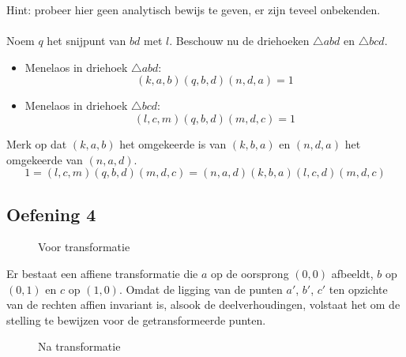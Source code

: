 \documentclass[main.tex]{subfiles}
\begin{document}
Hint: probeer hier geen analytisch bewijs te geven, er zijn teveel onbekenden.\\\\
Noem $q$ het snijpunt van $bd$ met $l$.
Beschouw nu de driehoeken $\triangle abd$ en $\triangle bcd$.
\begin{itemize}
\item Menelaos in driehoek $\triangle abd$:
  \[ (k,a,b)(q,b,d)(n,d,a) = 1 \]
\item Menelaos in driehoek $\triangle bcd$:
  \[ (l,c,m)(q,b,d)(m,d,c) = 1 \]
\end{itemize}
Merk op dat $(k,a,b)$ het omgekeerde is van $(k,b,a)$ en $(n,d,a)$ het omgekeerde van $(n,a,d)$.
\[ 1 = (l,c,m)(q,b,d)(m,d,c) = (n,a,d)(k,b,a)(l,c,d)(m,d,c) \]

\subsection{Oefening 4}
\begin{figure}[H]
  \centering
  \caption{Voor transformatie}
\end{figure}
Er bestaat een affiene transformatie die $a$ op de oorsprong $(0,0)$ afbeeldt, $b$ op $(0,1)$ en $c$ op $(1,0)$.
Omdat de ligging van de punten $a'$, $b'$, $c'$ ten opzichte van de rechten affien invariant is, alsook de deelverhoudingen, volstaat het om de stelling te bewijzen voor de getransformeerde punten.
\begin{figure}[H]
  \centering
  \caption{Na transformatie}
\end{figure}
\end{document}

